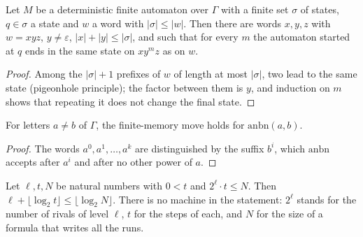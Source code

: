 \begin{theorem}
  \label{thm:structure-bombeo-finito}
  \leanok
  Let $M$ be a deterministic finite automaton over $\Gamma$ with a finite set $\sigma$ of states,
  $q \in \sigma$ a state and $w$ a word with $|\sigma| \le |w|$. Then there are words $x, y, z$ with
  $w = xyz$, $y \neq \varepsilon$, $|x| + |y| \le |\sigma|$, and such that for every $m$ the
  automaton started at $q$ ends in the same state on $x y^m z$ as on $w$.
  \own{}
\end{theorem}

\begin{proof}
  \leanok
  Among the $|\sigma| + 1$ prefixes of $w$ of length at most $|\sigma|$, two lead to the same state
  (pigeonhole principle); the factor between them is $y$, and induction on $m$ shows that
  repeating it does not change the final state.
\end{proof}

\begin{theorem}
  \label{thm:structure-anbn-jugada}
  \leanok
  For letters $a \neq b$ of $\Gamma$, the finite-memory move holds for $\mathrm{anbn}(a, b)$.
  \own{}
\end{theorem}

\begin{proof}
  \leanok
  The words $a^0, a^1, \dots, a^k$ are distinguished by the suffix $b^i$, which $\mathrm{anbn}$
  accepts after $a^i$ and after no other power of $a$.
\end{proof}

\begin{theorem}
  \label{thm:structure-profundidad-normalizada}
  \leanok
  Let $\ell, t, N$ be natural numbers with $0 < t$ and $2^\ell \cdot t \le N$. Then
  $\ell + \lfloor \log_2 t \rfloor \le \lfloor \log_2 N \rfloor$. There is no machine in the
  statement: $2^\ell$ stands for the number of rivals of level $\ell$, $t$ for the steps of each, and
  $N$ for the size of a formula that writes all the runs.
  \own{}
\end{theorem}

